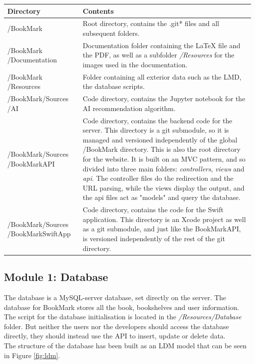 \documentclass[conference]{IEEEtran}
\begin{document}
\begin{center}
\begin{tabular}{| m{3cm} | p{4.6cm}|} 

\hline
\textbf{Directory} & \textbf{Contents} \\
 \hline
 /BookMark  & Root directory, contains the .git* files and all subsequent folders.\\
 \hline
 /BookMark /Documentation & Documentation folder containing the LaTeX file and the PDF, as well as a subfolder \textit{/Resources} for the images used in the documentation. \\
 \hline
 /BookMark /Resources & Folder containing all exterior data such as the LMD, the database scripts. \\
 \hline
 /BookMark/Sources /AI & Code directory, contains the Jupyter notebook for the AI recommendation algorithm. \\
 \hline
 /BookMark/Sources /BookMarkAPI & Code directory, contains the backend code for the server. This directory is a git submodule, so it is managed and versioned independently of the global /BookMark directory. This is also the root directory for the website. It is built on an MVC pattern, and so divided into three main folders: \textit{controllers}, \textit{views} and \textit{api}. The controller files do the redirection and the URL parsing, while the views display the output, and the api files act as "models" and query the database. \\
 \hline
 /BookMark/Sources /BookMarkSwiftApp & Code directory, contains the code for the Swift application. This directory is an Xcode project as well as a git submodule, and just like the BookMarkAPI, is versioned independently of the rest of the git directory.\\
 \hline
 
\end{tabular}
\end{center}

\subsection{Module 1: Database}

The database is a MySQL-server database, set directly on the server. The database for BookMark stores all the book, bookshelves and user information. The script for the database initialisation is located in the \textit{/Resources/Database} folder. But neither the users nor the developers should access the database directly, they should instead use the API to insert, update or delete data.\\
The structure of the database has been built as an LDM model that can be seen in Figure \ref{fig:ldm}.
\end{document}
